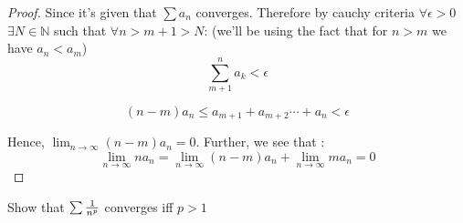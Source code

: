 \documentclass{notes}
\begin{document}
\begin{proof}
	Since it's given that $\sum a_n$ converges. Therefore by cauchy criteria $\forall \epsilon>0$ $\exists N \in \mathbb{N}$ such that $\forall n> m+1>N$: (we'll be using the fact that for $n>m$ we have $a_n<a_m$)
	$$ \sum_{m+1}^{n} a_k <\epsilon    $$ 	
	
	$$ (n-m)a_n \leq  a_{m+1}+a_{m+2} \cdots +a_n   <\epsilon$$
	
	Hence, $\lim_{n \to \infty} (n-m)a_n = 0$. Further, we see that :
	$$ \lim\limits_{n \to \infty} n a_n = \lim_{n \to \infty} (n-m)a_n + \lim_{n \to \infty} m a_n   = 0$$
\end{proof}
\begin{problem}
	Show that $\sum {1 \over n^p}$ converges iff $p > 1$
\end{problem}
\end{document}
